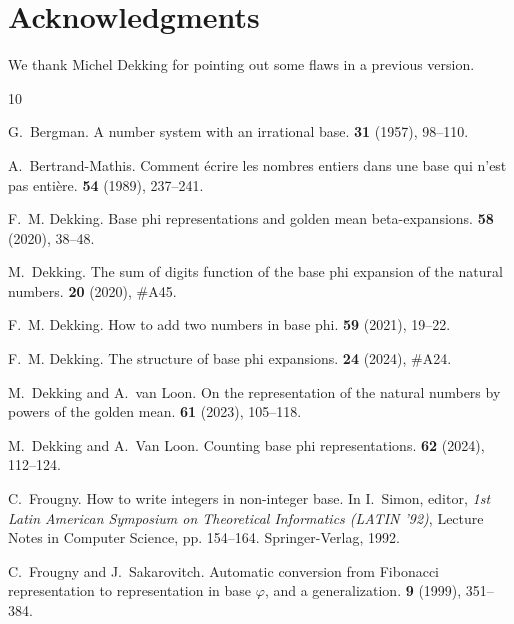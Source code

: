 \documentclass[12pt,reqno]{article}
\begin{document}
\section*{Acknowledgments}

We thank Michel Dekking for pointing out some flaws in a previous version.


\begin{thebibliography}{10}

G.~Bergman.
\newblock A number system with an irrational base.
 {\bf 31} (1957), 98--110.

A.~Bertrand-Mathis.
\newblock Comment \'ecrire les nombres entiers dans une base qui n'est pas
  enti\`ere.
 {\bf 54} (1989), 237--241.

F.~M. Dekking.
\newblock Base phi representations and golden mean beta-expansions.
 {\bf 58} (2020), 38--48.

M.~Dekking.
\newblock The sum of digits function of the base phi expansion of the natural
  numbers.
 {\bf 20} (2020), \#A45.

F.~M. Dekking.
\newblock How to add two numbers in base phi.
 {\bf 59} (2021), 19--22.

F.~M. Dekking.
\newblock The structure of base phi expansions.
 {\bf 24} (2024), \#A24.

M.~Dekking and A.~van Loon.
\newblock On the representation of the natural numbers by powers of the golden
  mean.
 {\bf 61} (2023), 105--118.

M.~Dekking and A.~Van Loon.
\newblock Counting base phi representations.
 {\bf 62} (2024), 112--124.

C.~Frougny.
\newblock How to write integers in non-integer base.
\newblock In I.~Simon, editor, {\em 1st Latin American Symposium on Theoretical
  Informatics (LATIN '92)}, Lecture Notes in Computer Science, pp.  154--164.
  Springer-Verlag, 1992.

C.~Frougny and J.~Sakarovitch.
\newblock Automatic conversion from {Fibonacci} representation to
  representation in base $\varphi$, and a generalization.
 {\bf 9} (1999), 351--384.


\end{thebibliography}
\end{document}
